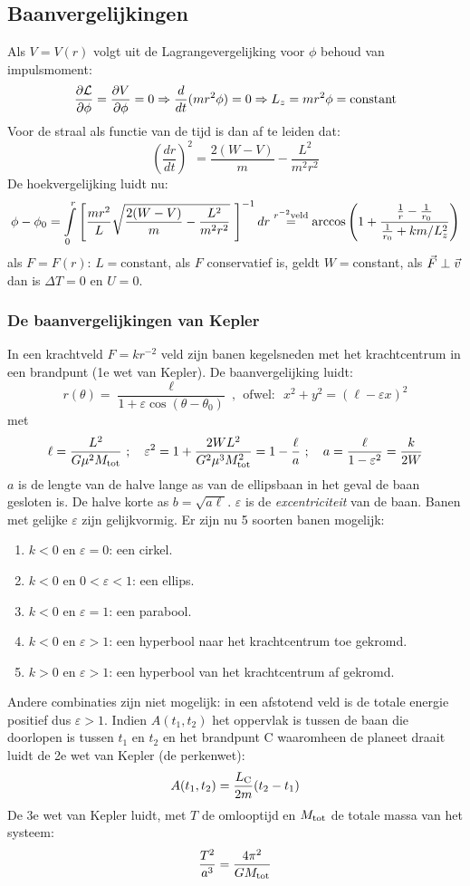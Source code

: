 \subsection{Baanvergelijkingen}
Als $V=V(r)$ volgt uit de Lagrangevergelijking voor $\phi$ behoud van
impulsmoment:
\[
\frac{\partial {\cal L}}{\partial \phi}=\frac{\partial V}{\partial \phi}=0\Rightarrow\frac{d}{dt}(mr^2\phi)=0\Rightarrow L_z=mr^2\phi=\mbox{constant}
\]
Voor de straal als functie van de tijd is dan af te leiden dat:
\[
\left(\frac{dr}{dt}\right)^2=\frac{2(W-V)}{m}-\frac{L^2}{m^2r^2}
\]
De hoekvergelijking luidt nu:
\[
\phi-\phi_0=\int\limits_0^r\left[\frac{mr^2}{L}\sqrt{\frac{2(W-V)}{m}-\frac{L^2}{m^2r^2}}~\right]^{-1}dr
\stackrel{r^{-2}{\rm veld}}{=}
\arccos\left(1+\frac{\frac{1}{r}-\frac{1}{r_0}}{\frac{1}{r_0}+km/L_z^2}\right)
\]
als $F=F(r)$: $L=$constant, als $F$ conservatief is, geldt $W=$constant, als
$\vec{F}\perp\vec{v}$ dan is $\Delta T=0$ en $U=0$.

\subsubsection{De baanvergelijkingen van Kepler}
In een krachtveld $F=kr^{-2}$ veld zijn banen kegelsneden met het
krachtcentrum in een brandpunt (1e wet van Kepler). De baanvergelijking luidt:
\[
r(\theta)=\frac{\ell}{1+\varepsilon\cos(\theta-\theta_0)}~,~~\mbox{ofwel:~~}
x^2+y^2=(\ell-\varepsilon x)^2
\]
met
\[
\ell=\frac{L^2}{G\mu^2M_{\rm tot}}~;~~~\varepsilon^2=1+\frac{2WL^2}{G^2\mu^3M^2_{\rm tot}}=1-\frac{\ell}{a}
~;~~~a=\frac{\ell}{1-\varepsilon^2}=\frac{k}{2W}
\]
$a$ is de lengte van de halve lange as van de ellipsbaan in het geval de baan
gesloten is. De halve korte as $b=\sqrt{a\ell}$. $\varepsilon$ is de
{\it excentriciteit} van de baan. Banen met gelijke $\varepsilon$ zijn
gelijkvormig. Er zijn nu 5 soorten banen mogelijk:
\begin{enumerate}
\item $k<0$ en $\varepsilon=0$: een cirkel.
\item $k<0$ en $0<\varepsilon<1$: een ellips.
\item $k<0$ en $\varepsilon=1$: een parabool.
\item $k<0$ en $\varepsilon>1$: een hyperbool naar het krachtcentrum toe gekromd.
\item $k>0$ en $\varepsilon>1$: een hyperbool van het krachtcentrum af gekromd.
\end{enumerate}
Andere combinaties zijn niet mogelijk: in een afstotend veld is de totale
energie positief dus $\varepsilon>1$.
\npar
Indien $A(t_1,t_2)$ het oppervlak is tussen de baan die doorlopen is tussen
$t_1$ en $t_2$ en het brandpunt C waaromheen de planeet draait luidt de 2e
wet van Kepler (de perkenwet):
\[
A(t_1,t_2)=\frac{L_{\rm C}}{2m}(t_2-t_1)
\]
De 3e wet van Kepler luidt, met $T$ de omlooptijd en $M_{\rm tot}$ de totale
massa van het systeem:
\[
\frac{T^2}{a^3}=\frac{4\pi^2}{GM_{\rm tot}}
\]
